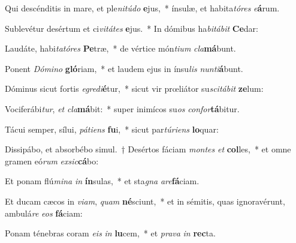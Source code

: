 \item Qui descénditis in mare, et ple\textit{ni}\textit{tú}\textit{do} \textbf{e}jus,~* ínsulæ, et habita\textit{tó}\textit{res} \textit{e}\textbf{á}rum.
\item Sublevétur desértum et ci\textit{vi}\textit{tá}\textit{tes} \textbf{e}jus.~* In dómibus ha\textit{bi}\textit{tá}\textit{bit} \textbf{Ce}dar:
\item Laudáte, habi\textit{ta}\textit{tó}\textit{res} \textbf{Pe}træ,~* de vértice món\textit{ti}\textit{um} \textit{cla}\textbf{má}bunt.
\item Ponent \textit{Dó}\textit{mi}\textit{no} \textbf{gló}riam,~* et laudem ejus in ínsu\textit{lis} \textit{nun}\textit{ti}\textbf{á}bunt.
\item Dóminus sicut fortis \textit{e}\textit{gre}\textit{di}\textbf{é}tur,~* sicut vir prœliátor su\textit{sci}\textit{tá}\textit{bit} \textbf{ze}lum:
\item Vociferábi\textit{tur}, \textit{et} \textit{cla}\textbf{má}bit:~* super inimícos su\textit{os} \textit{con}\textit{for}\textbf{tá}bitur.
\item Tácui semper, sílui, \textit{pá}\textit{ti}\textit{ens} \textbf{fu}i,~* sicut par\textit{tú}\textit{ri}\textit{ens} \textbf{lo}quar:
\item Dissipábo, et absorbébo simul.~† Desértos fáciam \textit{mon}\textit{tes} \textit{et} \textbf{col}les,~* et omne gramen eó\textit{rum} \textit{ex}\textit{sic}\textbf{cá}bo:
\item Et ponam flú\textit{mi}\textit{na} \textit{in} \textbf{ín}sulas,~* et sta\textit{gna} \textit{a}\textit{re}\textbf{fá}ciam.
\item Et ducam cæcos in \textit{vi}\textit{am}, \textit{quam} \textbf{né}sciunt,~* et in sémitis, quas ignoravérunt, ambulá\textit{re} \textit{e}\textit{os} \textbf{fá}ciam:
\item Ponam ténebras coram \textit{e}\textit{is} \textit{in} \textbf{lu}cem,~* et \textit{pra}\textit{va} \textit{in} \textbf{rec}ta.
